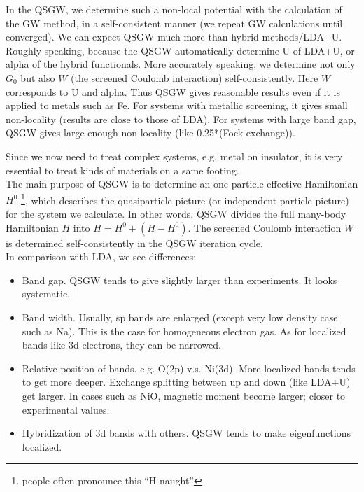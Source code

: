 \documentclass[a4paper,10pt,epsf,fleqn]{article}
\begin{document}
In the QSGW, we determine such a non-local potential with the calculation of the 
GW method, in a self-consistent manner (we repeat GW calculations
until converged). We can expect QSGW much more than hybrid methods/LDA+U.
Roughly speaking, because the QSGW automatically determine 
U of LDA+U, or alpha of the hybrid functionals. More accurately speaking,
we determine not only $G_0$ but also $W$  (the screened Coulomb
interaction) self-consistently. Here $W$ corresponds to U and alpha.
Thus QSGW gives reasonable results even if it is applied to metals such
as Fe. For systems with metallic screening, it gives small non-locality
(results are close to those of LDA). For systems with large band gap,
QSGW gives large enough non-locality (like 0.25*(Fock exchange)).

Since we now need to treat complex systems, e.g, metal on
insulator, it is very essential to treat kinds of materials
on a same footing.\\

The main purpose of QSGW is to determine an one-particle effective
Hamiltonian $H^0$  \footnote{people often pronounce this “H-naught”},
which describes the quasiparticle picture (or independent-particle
picture) for the system we calculate.
In other words, QSGW divides the full many-body Hamiltonian $H$ into
$H=H^0+(H-H^0)$.
The screened Coulomb interaction $W$ is determined self-consistently in
the QSGW iteration cycle.\\

\noindent In comparison with LDA, we see differences;
\begin{itemize}
\item
Band gap. QSGW tends to give slightly larger than experiments. It looks systematic.
\item
Band width. Usually, sp bands are enlarged 
     (except very low density case such as Na).
     This is the case for homogeneous electron gas.
     As for localized bands like 3d electrons, they can be narrowed.
\item
Relative position of bands. e.g. O(2p) v.s. Ni(3d).
More localized bands tends to get more deeper.
Exchange splitting between up and down (like LDA+U) get larger.
In cases such as NiO, magnetic moment become larger; closer to
experimental values.
\item
Hybridization of 3d bands with others. 
QSGW tends to make eigenfunctions localized.
\end{itemize}
\end{document}
